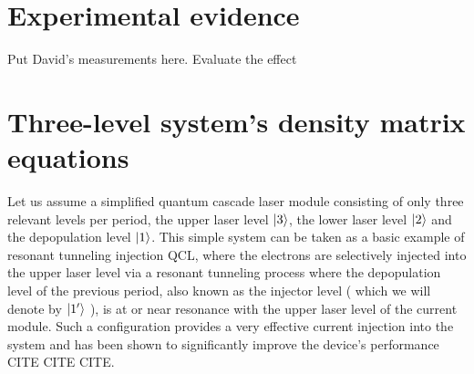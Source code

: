\documentclass[]{spie}  %
\begin{document}
\section{Experimental evidence}

Put David's measurements here. Evaluate the effect 


\section{Three-level system's density matrix equations}
Let us assume a simplified quantum cascade laser module consisting of only three relevant levels per period, the upper laser level $\ket{3}$, the lower laser level $\ket{2}$ and the depopulation level $\ket{1}$. This simple system can be taken as a basic example of resonant tunneling injection QCL, where the electrons are selectively injected into the upper laser level via a resonant tunneling process where the depopulation level of the previous period, also known as the injector level ( which we will denote by $\ket{1'}$ ), is at or near resonance with the upper laser level of the current module. Such a configuration provides a very effective current injection into the system and has been shown to significantly improve the device's performance CITE CITE CITE. 
\end{document}
